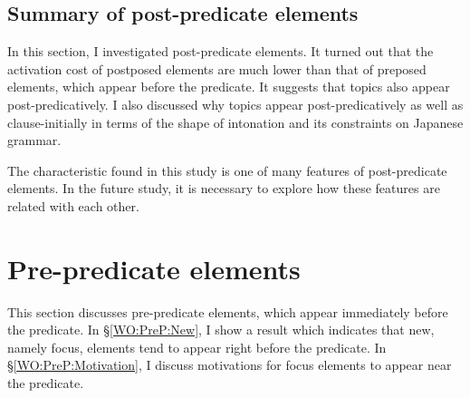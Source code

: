 \subsection{Summary of post-predicate elements}

In this section,
I investigated post-predicate elements.
It turned out that
the activation cost of postposed elements are much lower than
that of preposed elements,
which appear before the predicate.
It suggests that topics also appear post-predicatively.
I also discussed why
topics appear post-predicatively as well as clause-initially
in terms of the shape of intonation and its constraints on Japanese grammar.

The characteristic found in this study is one of many features of post-predicate elements.
In the future study,
it is necessary to explore how these features are related with each other.


\section{Pre-predicate elements}\label{WOPrePredEles}

This section discusses pre-predicate elements,
which appear immediately before the predicate.
In \S \ref{WO:PreP:New},
I show a result which indicates that
new, namely focus, elements tend to appear right before the predicate.
In \S \ref{WO:PreP:Motivation},
I discuss motivations for focus elements to appear near the predicate.

